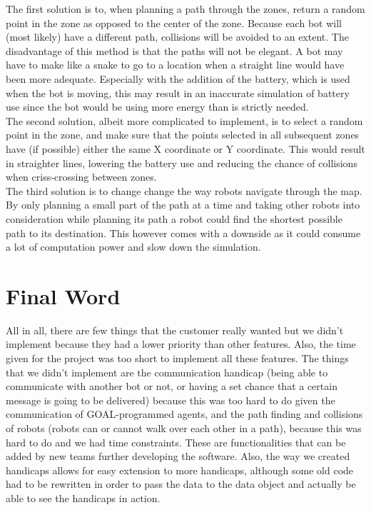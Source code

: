The first solution is to, when planning a path through the zones, return a random point in the zone as opposed to the center of the zone. Because each bot will (most likely) have a different path, collisions will be avoided to an extent. The disadvantage of this method is that the paths will not be elegant. A bot may have to make like a snake to go to a location when a straight line would have been more adequate. Especially with the addition of the battery, which is used when the bot is moving, this may result in an inaccurate simulation of battery use since the bot would be using more energy than is strictly needed. \\
The second solution, albeit more complicated to implement, is to select a random point in the zone, and make sure that the points selected in all subsequent zones have (if possible) either the same X coordinate or Y coordinate. This would result in straighter lines, lowering the battery use and reducing the chance of collisions when criss-crossing between zones. \\
The third solution is to change change the way robots navigate through the map. By only planning a small part of the path at a time and taking other robots into consideration while planning its path a robot could find the shortest possible path to its destination. This however comes with a downside as it could consume a lot of computation power and slow down the simulation.

\section{Final Word}
All in all, there are few things that the customer really wanted but we didn't implement because they had a lower priority than other features. Also, the time given for the project was too short to implement all these features. The things that we didn't implement are the communication handicap (being able to communicate with another bot or not, or having a set chance that a certain message is going to be delivered) because this was too hard to do given the communication of GOAL-programmed agents, and the path finding and collisions of robots (robots can or cannot walk over each other in a path), because this was hard to do and we had time constraints. These are functionalities that can be added by new teams further developing the software. Also, the way we created handicaps allows for easy extension to more handicaps, although some old code had to be rewritten in order to pass the data to the data object and actually be able to see the handicaps in action.
